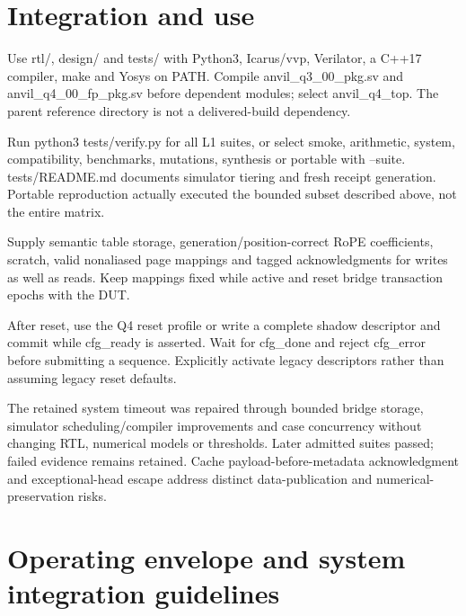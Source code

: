 \documentclass[11pt,a4paper]{article}
\begin{document}
\section{Integration and use}

Use rtl/\allowbreak{},\allowbreak{} design/\allowbreak{} and tests/\allowbreak{} with Python3,\allowbreak{} Icarus/\allowbreak{}vvp,\allowbreak{} Verilator,\allowbreak{} a C+\allowbreak{}+\allowbreak{}17 compiler,\allowbreak{} make and Yosys on PATH. Compile anvil\_\allowbreak{}q3\_\allowbreak{}00\_\allowbreak{}pkg.sv and anvil\_\allowbreak{}q4\_\allowbreak{}00\_\allowbreak{}fp\_\allowbreak{}pkg.sv before dependent modules; select anvil\_\allowbreak{}q4\_\allowbreak{}top. The parent reference directory is not a delivered-build dependency.


Run python3 tests/\allowbreak{}verify.py for all L1 suites,\allowbreak{} or select smoke,\allowbreak{} arithmetic,\allowbreak{} system,\allowbreak{} compatibility,\allowbreak{} benchmarks,\allowbreak{} mutations,\allowbreak{} synthesis or portable with --suite. tests/\allowbreak{}README.md documents simulator tiering and fresh receipt generation. Portable reproduction actually executed the bounded subset described above,\allowbreak{} not the entire matrix.


Supply semantic table storage,\allowbreak{} generation/\allowbreak{}position-correct RoPE coefficients,\allowbreak{} scratch,\allowbreak{} valid nonaliased page mappings and tagged acknowledgments for writes as well as reads. Keep mappings fixed while active and reset bridge transaction epochs with the DUT.


After reset,\allowbreak{} use the Q4 reset profile or write a complete shadow descriptor and commit while cfg\_\allowbreak{}ready is asserted. Wait for cfg\_\allowbreak{}done and reject cfg\_\allowbreak{}error before submitting a sequence. Explicitly activate legacy descriptors rather than assuming legacy reset defaults.


The retained system timeout was repaired through bounded bridge storage,\allowbreak{} simulator scheduling/\allowbreak{}compiler improvements and case concurrency without changing RTL,\allowbreak{} numerical models or thresholds. Later admitted suites passed; failed evidence remains retained. Cache payload-before-metadata acknowledgment and exceptional-head escape address distinct data-publication and numerical-preservation risks.


\section{Operating envelope and system integration guidelines}
\end{document}
